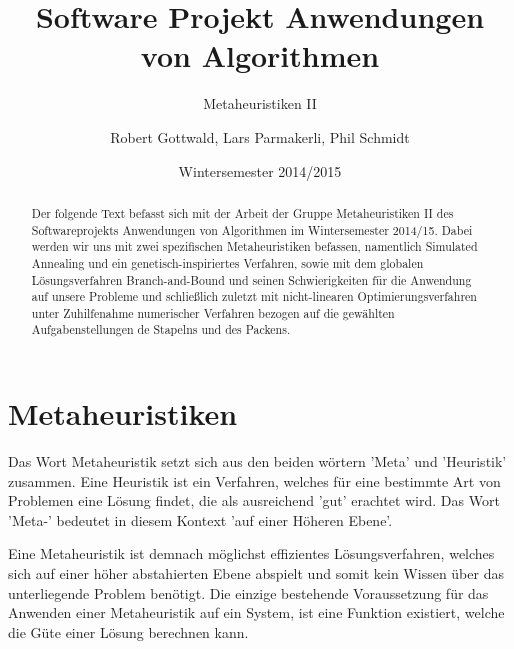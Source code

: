 \documentclass[runningheads,a4paper]{llncs}
\begin{document}
\mainmatter

\title{Software Projekt Anwendungen von Algorithmen}
\subtitle{Metaheuristiken II}
\date{Wintersemester 2014/2015}

\author{Robert Gottwald, Lars Parmakerli, Phil Schmidt}

\maketitle
\begin{abstract}
Der folgende Text befasst sich mit der Arbeit der Gruppe Metaheuristiken II des Softwareprojekts Anwendungen von Algorithmen im Wintersemester 2014/15. Dabei werden wir uns mit zwei  spezifischen Metaheuristiken befassen, namentlich Simulated Annealing und ein genetisch-inspiriertes Verfahren, sowie mit dem globalen Lösungsverfahren Branch-and-Bound und seinen Schwierigkeiten für die Anwendung auf unsere Probleme und schließlich zuletzt mit nicht-linearen Optimierungsverfahren unter Zuhilfenahme numerischer Verfahren bezogen auf die gewählten Aufgabenstellungen de Stapelns und des Packens.

\end{abstract}

\section{Metaheuristiken}

Das Wort Metaheuristik setzt sich aus den beiden wörtern 'Meta' und 'Heuristik'  zusammen.
Eine Heuristik ist ein Verfahren, welches für eine bestimmte Art von Problemen eine Lösung findet, die als ausreichend 'gut' erachtet wird. 
Das Wort 'Meta-' bedeutet in diesem Kontext 'auf einer Höheren Ebene'.

Eine Metaheuristik ist demnach möglichst effizientes Lösungsverfahren, welches sich auf einer höher abstahierten Ebene abspielt und somit kein Wissen über das unterliegende Problem benötigt. Die einzige bestehende Voraussetzung für das Anwenden einer Metaheuristik auf ein System, ist eine Funktion existiert, welche die Güte einer Lösung berechnen kann.
\end{document}
